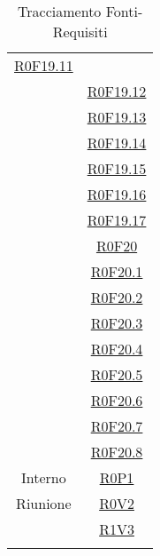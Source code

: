 \documentclass[../AnalisiDeiRequisiti.tex]{subfiles}
\begin{document}
\begin{longtable}{|c|c|}
\hyperlink{R0F19.11}{R0F19.11}\\& \hyperlink{R0F19.12}{R0F19.12}\\& \hyperlink{R0F19.13}{R0F19.13}\\& \hyperlink{R0F19.14}{R0F19.14}\\& \hyperlink{R0F19.15}{R0F19.15}\\& \hyperlink{R0F19.16}{R0F19.16}\\& \hyperlink{R0F19.17}{R0F19.17}\\& \hyperlink{R0F20}{R0F20}\\& \hyperlink{R0F20.1}{R0F20.1}\\& \hyperlink{R0F20.2}{R0F20.2}\\& \hyperlink{R0F20.3}{R0F20.3}\\& \hyperlink{R0F20.4}{R0F20.4}\\& \hyperlink{R0F20.5}{R0F20.5}\\& \hyperlink{R0F20.6}{R0F20.6}\\& \hyperlink{R0F20.7}{R0F20.7}\\& \hyperlink{R0F20.8}{R0F20.8}\\\hline
	Interno & \hyperlink{R0P1}{R0P1}\\\hline
	Riunione & \hyperlink{R0V2}{R0V2}\\& \hyperlink{R1V3}{R1V3}\\\hline
	\caption[Tracciamento Fonti-Requisiti]{Tracciamento Fonti-Requisiti}
	\label{tabella:fonti-requi}
\end{longtable}
\clearpage
\end{document}
